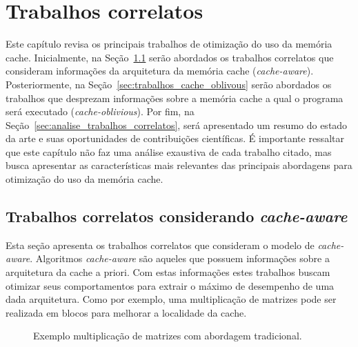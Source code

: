 \chapter{Trabalhos correlatos}
\label{cap:trabalhos_correlatos}

Este capítulo revisa os principais trabalhos de otimização do uso da memória cache.
Inicialmente, na Seção~\ref{sec:trabalhos_cache_aware} serão abordados os trabalhos correlatos que consideram informações da arquitetura da memória cache (\textit{cache-aware}).
Posteriormente, na Seção~\ref{sec:trabalhos_cache_oblivous} serão abordados os trabalhos que desprezam informações sobre a memória cache a qual o programa será executado (\textit{cache-oblivious}).
Por fim, na Seção~\ref{sec:analise_trabalhos_correlatos}, será apresentado um resumo do estado da arte e suas oportunidades de contribuições científicas.
É importante ressaltar que este capítulo não faz uma análise exaustiva de cada trabalho citado, mas busca apresentar as características mais relevantes das principais abordagens para otimização do uso da memória cache.

\section{Trabalhos correlatos considerando \textit{cache-aware}}
\label{sec:trabalhos_cache_aware}

Esta seção apresenta os trabalhos correlatos que consideram o modelo de \textit{cache-aware}.
Algoritmos \textit{cache-aware} são aqueles que possuem informações sobre a arquitetura da cache a priori.
Com estas informações estes trabalhos buscam otimizar seus comportamentos para extrair o máximo de desempenho de uma dada arquitetura.
Como por exemplo, uma multiplicação de matrizes pode ser realizada em blocos para melhorar a localidade da cache.

\begin{figure}[hb]
    \centering
    \caption[Exemplo multiplicação de matrizes]{Exemplo multiplicação de matrizes com abordagem tradicional.}
    \label{fig:multiplicacao_matriz}
\end{figure}

